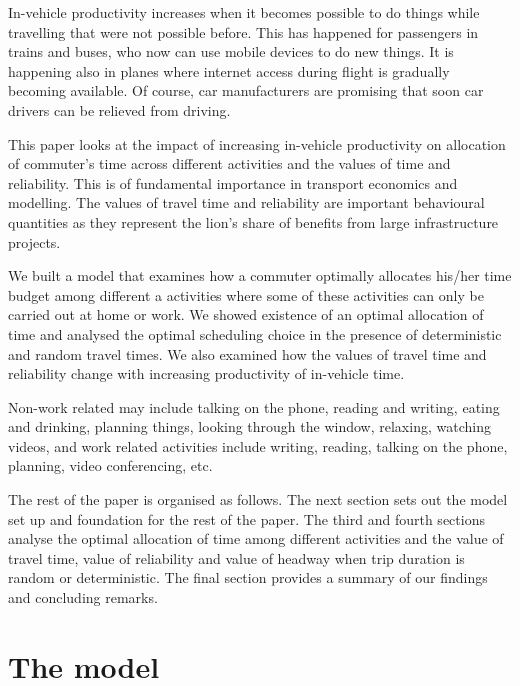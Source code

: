 \documentclass[12pt,a4paper,british]{article}
\begin{document}
In-vehicle productivity increases when it becomes possible to do things while travelling that were not possible before. This has happened for passengers in trains and buses, who now can use mobile devices  to do new things. It is happening also in planes where internet access during flight is gradually becoming available. Of course, car manufacturers are promising that soon car drivers can be relieved from driving.

This paper looks at the impact of increasing in-vehicle productivity on allocation of commuter's time across different activities and the values of time and reliability. This is of fundamental importance in transport economics and modelling. The values of travel time and reliability are important behavioural quantities as they represent the lion's share of benefits from large infrastructure projects. 

We built a model that examines how a commuter optimally allocates his/her time budget among different a activities where some of these activities can only be carried out at home or work. We showed existence of an optimal allocation of time and analysed the optimal scheduling choice in the presence of deterministic and random travel times. We also examined how the values of travel time and reliability change with increasing productivity of in-vehicle time.

Non-work related may include talking on the phone, reading and writing, eating and drinking, planning things, looking through the window, relaxing, watching videos,
and work related activities include writing, reading, talking on the phone, planning, video conferencing, etc.

The rest of the paper is organised as follows. The next section sets out the model set up and foundation for the rest of the paper. The third and fourth sections analyse the optimal allocation of time among different activities and the value of travel time, value of reliability and value of headway when trip duration is random or deterministic. The final section provides a summary of our findings and concluding remarks.

\section{The model}
\label{sec:model1}
\end{document}
